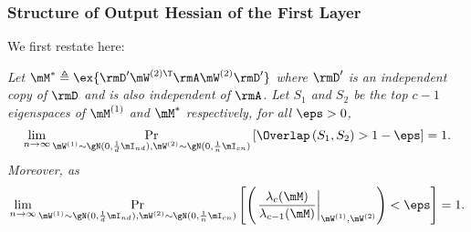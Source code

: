 \subsubsection{Structure of Output Hessian of the First Layer}
\label{sec:proof-out-hessian}

We first restate  here:

\noindent\textbf{} \emph{Let $\mM^*\triangleq \ex{\rmD'\mW^{(2)\T}\rmA\mW^{(2)}\rmD'}$ where $\rmD'$ is an independent copy of $\rmD$ and is also independent of $\rmA$. Let $S_1$ and $S_2$ be the top $c-1$ eigenspaces of $\mM^{(1)}$ and $\mM^*$ respectively, for all $\eps>0$,
\begin{equation}
    \lim_{n\to\infty}\mathop{\Pr}_{\mW^{(1)}\sim\gN(0,\frac{1}{d}\mI_{nd}), \mW^{(2)}\sim\gN(0,\frac{1}{n}\mI_{cn})}\left[\Overlap\left(S_1,S_2\right)>1-\eps\right] = 1.
\end{equation}
Moreover, as\begin{equation}
    \lim_{n\to\infty}\mathop{\Pr}_{\mW^{(1)}\sim\gN(0,\frac{1}{d}\mI_{nd}), \mW^{(2)}\sim\gN(0,\frac{1}{n}\mI_{cn})}\left[\left(\left.\frac{\lambda_c(\mM)}{\lambda_{c-1}(\mM)}\right|_{\mW^{(1)}, \mW^{(2)}}\right) < \eps\right] = 1.
\end{equation}}

\begin{proofof}{}
\end{proofof}

